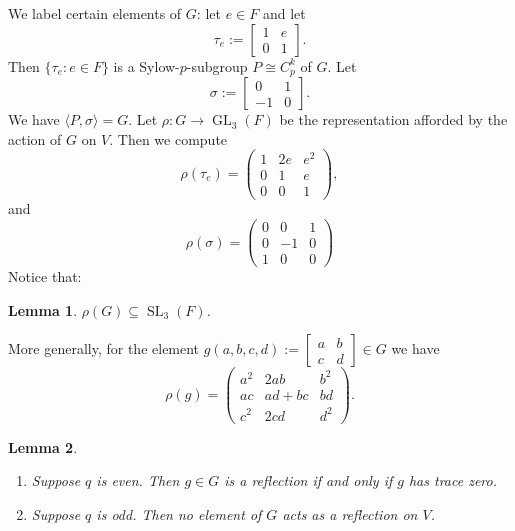 \documentclass[a4paper]{amsart}
\def\GL{\operatorname{GL}}
\def\SL{\operatorname{SL}}
\newtheorem{Lemma}{Lemma}[section]
\newtheorem*{Corollary of Conjecture}{Corollary of Conjecture}
\theoremstyle{definition}
\theoremstyle{remark}
\theoremstyle{Acknowledgments}
\begin{document}
We label certain elements of $G$: let $e \in F$ and let 
\[\tau_e:= \begin{bmatrix} 1 & e\\ 0 & 1 \end{bmatrix}.\]
Then $\{\tau_e: e \in F\}$ is a Sylow-$p$-subgroup $P \cong C^k_p$ of $G$. Let
\[\sigma:= \begin{bmatrix} 0 & 1 \\ -1 & 0 \end{bmatrix}.\] We have $\langle P, \sigma \rangle = G$.
Let $\rho: G \rightarrow \GL_3(F)$ be the representation afforded by the action of $G$ on $V$. Then we compute
\[\rho(\tau_e) = \begin{pmatrix} 1 & 2e & e^2\\ 0 & 1 & e\\ 0 & 0 & 1 \end{pmatrix},\]
and
\[\rho(\sigma) = \begin{pmatrix} 0 & 0 & 1\\ 0 & -1 & 0 \\ 1 & 0 & 0 \end{pmatrix}\]
Notice that:
\begin{Lemma}\label{insl3} 
$\rho(G) \subseteq \SL_3(F)$.
\end{Lemma}

More generally, for the element $g(a,b,c,d):= \begin{bmatrix} a&b\\c&d \end{bmatrix} \in G$ we have
\begin{equation}\label{rho}\rho(g) = \begin{pmatrix} a^2 & 2ab & b^2 \\ ac & ad+bc & bd \\ c^2 & 2cd & d^2   \end{pmatrix}.\end{equation}

\begin{Lemma}\label{norefs}\
\begin{enumerate}
\item[(a)] Suppose $q$ is even. Then $g \in G$ is a reflection if and only if $g$ has trace zero.
\item[(b)] Suppose $q$ is odd. Then no element of $G$ acts as a reflection on $V$.
\end{enumerate}
\end{Lemma}
\end{document}

